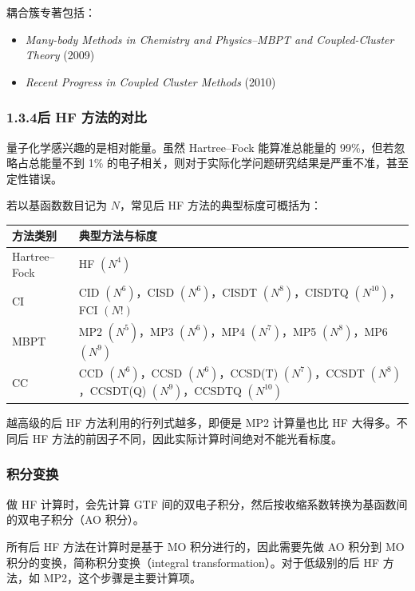 耦合簇专著包括：
\begin{itemize}
  \item \textit{Many-body Methods in Chemistry and Physics--MBPT and Coupled-Cluster Theory} (2009)
  \item \textit{Recent Progress in Coupled Cluster Methods} (2010)
\end{itemize}

\subsubsection*{1.3.4\quad 后 HF 方法的对比}

量子化学感兴趣的是相对能量。虽然 Hartree--Fock 能算准总能量的 99\%，但若忽略占总能量不到 1\% 的电子相关，则对于实际化学问题研究结果是严重不准，甚至定性错误。

若以基函数数目记为 $N$，常见后 HF 方法的典型标度可概括为：

\begin{center}
\small
\begin{tabular}{>{\raggedright\arraybackslash}p{} >{\raggedright\arraybackslash}p{}}
\toprule
方法类别 & 典型方法与标度 \\
\midrule
Hartree--Fock & HF $(N^4)$ \\
CI & CID $(N^6)$，CISD $(N^6)$，CISDT $(N^8)$，CISDTQ $(N^{10})$，FCI $(N!)$ \\
MBPT & MP2 $(N^5)$，MP3 $(N^6)$，MP4 $(N^7)$，MP5 $(N^8)$，MP6 $(N^9)$ \\
CC & CCD $(N^6)$，CCSD $(N^6)$，CCSD(T) $(N^7)$，CCSDT $(N^8)$，CCSDT(Q) $(N^9)$，CCSDTQ $(N^{10})$ \\
\bottomrule
\end{tabular}
\normalsize
\end{center}

越高级的后 HF 方法利用的行列式越多，即便是 MP2 计算量也比 HF 大得多。不同后 HF 方法的前因子不同，因此实际计算时间绝对不能光看标度。

\subsubsection*{积分变换}

做 HF 计算时，会先计算 GTF 间的双电子积分，然后按收缩系数转换为基函数间的双电子积分（AO 积分）。

所有后 HF 方法在计算时是基于 MO 积分进行的，因此需要先做 AO 积分到 MO 积分的变换，简称积分变换（integral transformation）。对于低级别的后 HF 方法，如 MP2，这个步骤是主要计算项。

